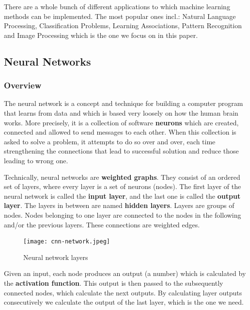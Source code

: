 \documentclass[../Main.tex]{subfiles}
\begin{document}
    There are a whole bunch of different applications to which machine learning methods can be implemented. The most popular ones incl.: Natural Language Processing, Classification Problems, Learning Associations, Pattern Recognition and Image Processing which is the one we focus on in this paper.


\subsection{Neural Networks}
    \subsubsection{Overview}
    The neural network is a concept and technique for building a computer program that learns from data and which is based very loosely on how the human brain works. More precisely, it is a collection of software \textbf{neurons} which are created, connected and allowed to send messages to each other. When this collection is asked to solve a problem, it attempts to do so over and over, each time strengthening the connections that lead to successful solution and reduce those leading to wrong one.
    
     Technically, neural networks are \textbf{weighted graphs}. They consist of an ordered set of layers, where every layer is a set of neurons (nodes). The first layer of the neural network is called the \textbf{input layer}, and the last one is called the \textbf{output layer}. The layers in between are named \textbf{hidden layers}. Layers are groups of nodes. Nodes belonging to one layer are connected to the nodes in the following and/or the previous layers. These connections are weighted edges. \\ 
    \begin{figure}[h!]
        \centering
        \texttt{[image: cnn-network.jpeg]}
        \caption{Neural network layers}
        \label{fig:nn-scheme}
    \end{figure}

    Given an input, each node produces an output (a number) which is calculated by the \textbf{activation function}. This output is then passed to the subsequently connected nodes, which calculate the next outputs. By calculating layer outputs consecutively we calculate the output of the last layer, which is the one we need.
    
\end{document}
